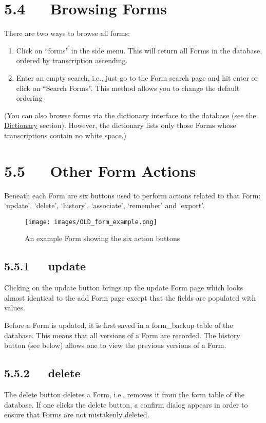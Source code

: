 \documentclass[letterpaper,10pt,english]{sphinxmanual}
\begin{document}
\section{5.4   Browsing Forms}
\label{documentation:browsing-forms}
There are two ways to browse all forms:
\begin{enumerate}
\item {} 
Click on ``forms'' in the side menu.  This will return all Forms in the
database, ordered by transcription ascending.

\item {} 
Enter an empty search, i.e., just go to the Form search page and hit enter
or click on ``Search Forms''.  This method allows you to change the default
ordering

\end{enumerate}

(You can also browse forms via the dictionary interface to the database (see the
{\hyperref[documentation:dictionary]{Dictionary}} section).  However, the dictionary lists only those Forms whose
transcriptions contain no white space.)


\section{5.5   Other Form Actions}
\label{documentation:other-form-actions}
Beneath each Form are six buttons used to perform actions related to that Form:
`update', `delete', `history', `associate', `remember' and `export'.
\begin{figure}[htbp]
\centering
\capstart

\texttt{[image: images/OLD\_form\_example.png]}
\caption{An example Form showing the six action buttons}\end{figure}


\subsection{5.5.1   update}
\label{documentation:update}
Clicking on the update button brings up the update Form page which looks almost
identical to the add Form page except that the fields are populated with values.

Before a Form is updated, it is first saved in a form\_backup table of the
database.  This means that all versions of a Form are recorded.  The history
button (see below) allows one to view the previous versions of a Form.


\subsection{5.5.2   delete}
\label{documentation:delete}
The delete button deletes a Form, i.e., removes it from the form table of the
database.  If one clicks the delete button, a confirm dialog appears in order to
ensure that Forms are not mistakenly deleted.
\end{document}
